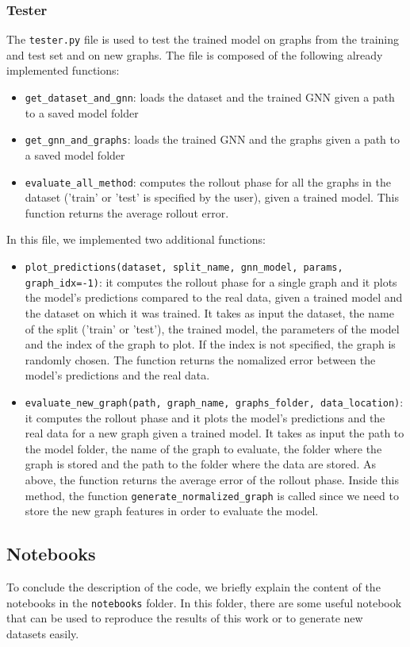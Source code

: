 \documentclass[11pt,a4paper]{article}
\begin{document}
\subsubsection*{Tester}
The \texttt{tester.py} file is used to test the trained model on graphs from the training and test set and on new graphs. The file is composed of the following already implemented functions: 
\begin{itemize}
    \item \texttt{get\_dataset\_and\_gnn}: loads the dataset and the trained GNN given a path to a saved model folder
    \item \texttt{get\_gnn\_and\_graphs}: loads the trained GNN and the graphs given a path to a saved model folder
    \item \texttt{evaluate\_all\_method}: computes the rollout phase for all the graphs in the dataset ('train' or 'test' is specified by the user), given a trained model. This function returns the average rollout error. 
\end{itemize}

In this file, we implemented two additional functions:
\begin{itemize}
    \item \texttt{plot\_predictions(dataset, split\_name, gnn\_model, params, graph\_idx=-1)}: it computes the rollout phase for a single graph and it plots the model's predictions compared to the real data, given a trained model and the dataset on which it was trained.
    It takes as input the dataset, the name of the split ('train' or 'test'), the trained model, the parameters of the model and the index of the graph to plot. If the index is not specified, the graph is randomly chosen. The function returns the nomalized error between the model's predictions and the real data.
    \item \texttt{evaluate\_new\_graph(path, graph\_name, graphs\_folder, data\_location)}: it computes the rollout phase and it plots the model's predictions and the real data for a new graph given a trained model. It takes as input the path to the model folder, the name of the graph to evaluate, the folder where the graph is stored and the path to the folder where the data are stored. As above, the function returns the average error of the rollout phase. Inside this method, the function \texttt{generate\_normalized\_graph} is called since we need to store the new graph features in order to evaluate the model.
\end{itemize}

\subsection{Notebooks}
To conclude the description of the code, we briefly explain the content of the notebooks in the \texttt{notebooks} folder. In this folder, there are some useful notebook that can be used to reproduce the results of this work or to generate new datasets easily.
\end{document}
